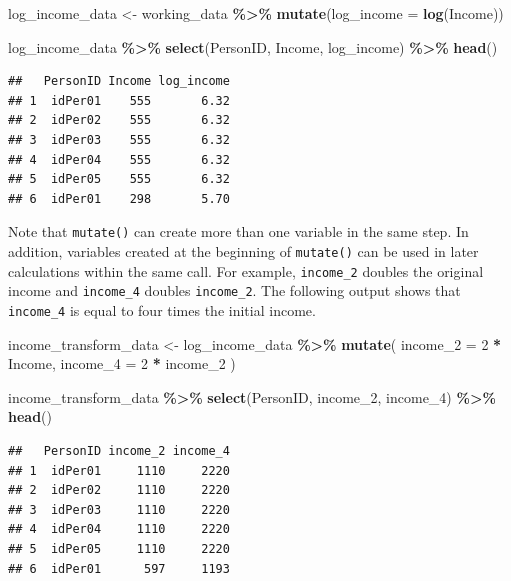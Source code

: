 \documentclass[
  english,
  12pt,
]{book}
\newenvironment{Shaded}{\begin{snugshade}}{\end{snugshade}}
\newcommand{\AttributeTok}[1]{\textcolor[rgb]{0.13,0.29,0.53}{#1}}
\newcommand{\DecValTok}[1]{\textcolor[rgb]{0.00,0.00,0.81}{#1}}
\newcommand{\FunctionTok}[1]{\textcolor[rgb]{0.13,0.29,0.53}{\textbf{#1}}}
\newcommand{\NormalTok}[1]{#1}
\newcommand{\OtherTok}[1]{\textcolor[rgb]{0.56,0.35,0.01}{#1}}
\newcommand{\SpecialCharTok}[1]{\textcolor[rgb]{0.81,0.36,0.00}{\textbf{#1}}}
\begin{document}
\begin{Shaded}
\begin{Highlighting}[]
\NormalTok{log\_income\_data }\OtherTok{\textless{}{-}}\NormalTok{ working\_data }\SpecialCharTok{\%\textgreater{}\%}
  \FunctionTok{mutate}\NormalTok{(}\AttributeTok{log\_income =} \FunctionTok{log}\NormalTok{(Income))}

\NormalTok{log\_income\_data }\SpecialCharTok{\%\textgreater{}\%}
  \FunctionTok{select}\NormalTok{(PersonID, Income, log\_income) }\SpecialCharTok{\%\textgreater{}\%}
  \FunctionTok{head}\NormalTok{()}
\end{Highlighting}
\end{Shaded}

\begin{verbatim}
##   PersonID Income log_income
## 1  idPer01    555       6.32
## 2  idPer02    555       6.32
## 3  idPer03    555       6.32
## 4  idPer04    555       6.32
## 5  idPer05    555       6.32
## 6  idPer01    298       5.70
\end{verbatim}

Note that \texttt{mutate()} can create more than one variable in the same step. In addition, variables created at the beginning of \texttt{mutate()} can be used in later calculations within the same call. For example, \texttt{income\_2} doubles the original income and \texttt{income\_4} doubles \texttt{income\_2}. The following output shows that \texttt{income\_4} is equal to four times the initial income.

\begin{Shaded}
\begin{Highlighting}[]
\NormalTok{income\_transform\_data }\OtherTok{\textless{}{-}}\NormalTok{ log\_income\_data }\SpecialCharTok{\%\textgreater{}\%}
  \FunctionTok{mutate}\NormalTok{(}
    \AttributeTok{income\_2 =} \DecValTok{2} \SpecialCharTok{*}\NormalTok{ Income,}
    \AttributeTok{income\_4 =} \DecValTok{2} \SpecialCharTok{*}\NormalTok{ income\_2}
\NormalTok{  )}

\NormalTok{income\_transform\_data }\SpecialCharTok{\%\textgreater{}\%}
  \FunctionTok{select}\NormalTok{(PersonID, income\_2, income\_4) }\SpecialCharTok{\%\textgreater{}\%}
  \FunctionTok{head}\NormalTok{()}
\end{Highlighting}
\end{Shaded}

\begin{verbatim}
##   PersonID income_2 income_4
## 1  idPer01     1110     2220
## 2  idPer02     1110     2220
## 3  idPer03     1110     2220
## 4  idPer04     1110     2220
## 5  idPer05     1110     2220
## 6  idPer01      597     1193
\end{verbatim}
\end{document}
